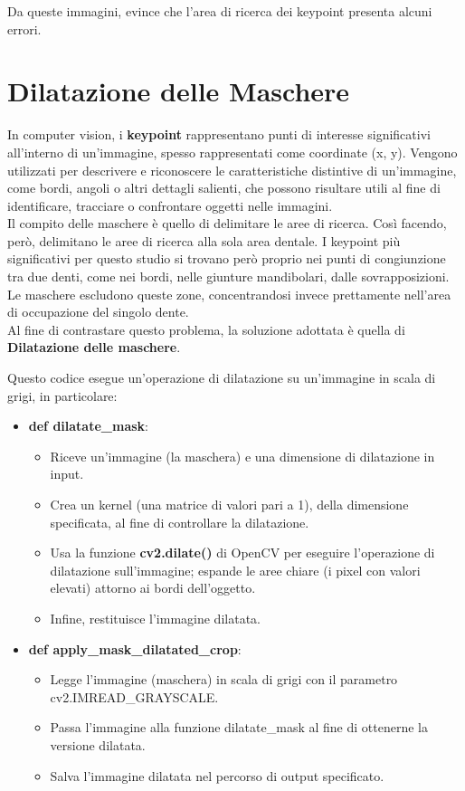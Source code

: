 \documentclass[12pt,a4paper,openright,twoside]{book}
\begin{document}
Da queste immagini, evince che l'area di ricerca dei keypoint presenta alcuni errori.

\section{Dilatazione delle Maschere}
In computer vision, i \textbf{keypoint} rappresentano punti di interesse significativi all'interno di un'immagine, spesso rappresentati come coordinate (x, y). Vengono utilizzati per descrivere e riconoscere le caratteristiche distintive di un'immagine, come bordi, angoli o altri dettagli salienti, che possono risultare utili al fine di identificare, tracciare o confrontare oggetti nelle immagini.\\

Il compito delle maschere è quello di delimitare le aree di ricerca. Così facendo, però, delimitano le aree di ricerca alla sola area dentale. I keypoint più significativi per questo studio si trovano però proprio nei punti di congiunzione tra due denti, come nei bordi, nelle giunture mandibolari, dalle sovrapposizioni. Le maschere escludono queste zone, concentrandosi invece prettamente nell'area di occupazione del singolo dente.\\

Al fine di contrastare questo problema, la soluzione adottata è quella di \textbf{Dilatazione delle maschere}.
\begin{figure}[H]
    \centering
    
\end{figure}

Questo codice esegue un'operazione di dilatazione su un'immagine in scala di grigi, in particolare:
\begin{itemize}
\item \textbf{def dilatate\_mask}:\\
\begin{itemize}
\item Riceve un'immagine (la maschera) e una dimensione di dilatazione in input.
\item Crea un kernel (una matrice di valori pari a 1), della dimensione specificata, al fine di controllare la dilatazione.
\item Usa la funzione \textbf{cv2.dilate()} di OpenCV per eseguire l'operazione di dilatazione sull'immagine; espande le aree chiare (i pixel con valori elevati) attorno ai bordi dell'oggetto.
\item Infine, restituisce l'immagine dilatata.
\end{itemize}
\item \textbf{def apply\_mask\_dilatated\_crop}:
\begin{itemize}
\item Legge l'immagine (maschera) in scala di grigi con il parametro cv2.IMREAD\_GRAYSCALE.
\item Passa l'immagine alla funzione dilatate\_mask al fine di ottenerne la versione dilatata.
\item Salva l'immagine dilatata nel percorso di output specificato.
\end{itemize}
\end{itemize}
\end{document}

